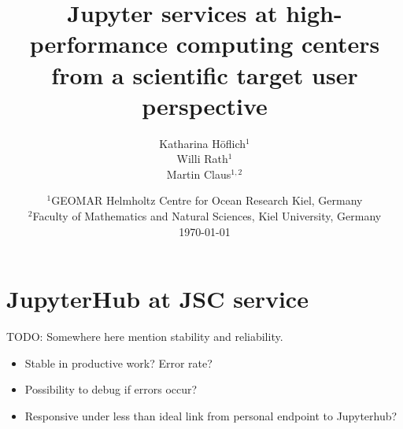 \documentclass[11pt,a4paper]{article}
\title{\textbf{Jupyter services at high-performance computing centers from a scientific target user perspective}}
\author{
  Katharina Höflich$^1$\\
  Willi Rath$^1$\\
  Martin Claus$^{1,2}$
  }
\date{
  {\footnotesize$^1$GEOMAR Helmholtz Centre for Ocean Research Kiel, Germany}\\
  {\footnotesize$^2$Faculty of Mathematics and Natural Sciences, Kiel University, Germany}\\[2ex]
  \today
}
\begin{document}
\maketitle


\tableofcontents


%





\section{JupyterHub at JSC service}









TODO: Somewhere here mention stability and reliability.
\begin{itemize}
	\item Stable in productive work? Error rate?
  \item Possibility to debug if errors occur?
  \item Responsive under less than ideal link from personal endpoint to Jupyterhub?
\end{itemize}












\end{document}
